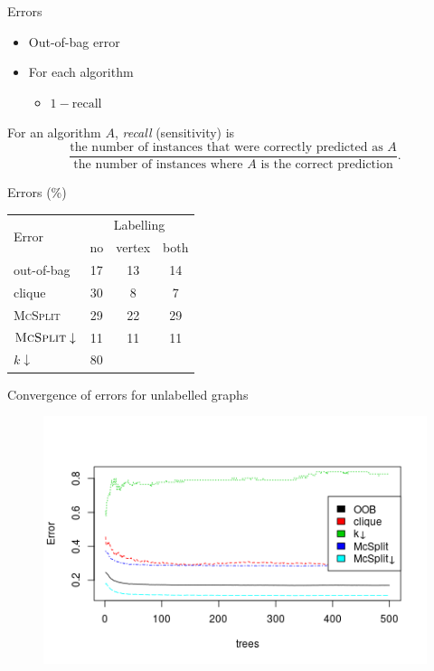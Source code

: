 \documentclass{beamer}
\begin{document}
\begin{frame}{Errors}
  \begin{itemize}
  \item Out-of-bag error
  \item For each algorithm
    \begin{itemize}
    \item $1 - \text{recall}$
    \end{itemize}
  \end{itemize}
  \begin{definition}
    For an algorithm $A$, \emph{recall} (sensitivity) is
    \[ \frac{\text{the number of instances that were correctly predicted as
          $A$}}{\text{the number of instances where $A$ is the correct
          prediction}}. \]
  \end{definition}
\end{frame}

\begin{frame}{Errors (\%)}
  \centering
  \begin{tabular}{l | c c c}
    \multirow{2}{*}{Error} & \multicolumn{3}{c}{Labelling} \\
                           & no & vertex & both \\
    \hline
    out-of-bag & 17 & 13 & 14 \\
    clique & 30 & 8 & 7 \\
    \textsc{McSplit} & 29 & 22 & 29 \\
    $\textsc{McSplit}\downarrow$ & 11 & 11 & 11 \\
    $k\downarrow$ & 80 & &
  \end{tabular}
\end{frame}

\begin{frame}{Convergence of errors for unlabelled graphs}
  \begin{figure}
    \centering
    \includegraphics[scale=0.5]{../dissertation/images/unlabelled_forest_errors.png}
  \end{figure}
\end{frame}
\end{document}

